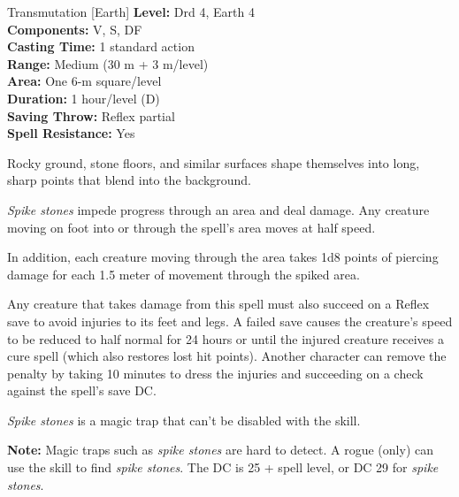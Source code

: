 {Transmutation [Earth]}
{
	\textbf{Level:}
	Drd 4, Earth 4\\
	\textbf{Components:}
	V, S, DF\\
	\textbf{Casting Time:}
	1 standard action\\
	\textbf{Range:}
	Medium (30 m + 3 m/level)\\
	\textbf{Area:}
	One 6-m square/level\\
	\textbf{Duration:}
	1 hour/level (D)\\
	\textbf{Saving Throw:}
	Reflex partial\\
	\textbf{Spell Resistance:}
	Yes\\
}
{
	Rocky ground, stone floors, and similar surfaces shape themselves into long, sharp points that blend into the background.

	\emph{Spike stones} impede progress through an area and deal damage. Any creature moving on foot into or through the spell's area moves at half speed.

	In addition, each creature moving through the area takes 1d8 points of piercing damage for each 1.5 meter of movement through the spiked area.

	Any creature that takes damage from this spell must also succeed on a Reflex save to avoid injuries to its feet and legs. A failed save causes the creature's speed to be reduced to half normal for 24 hours or until the injured creature receives a cure spell (which also restores lost hit points). Another character can remove the penalty by taking 10 minutes to dress the injuries and succeeding on a  check against the spell's save DC.

	\emph{Spike stones} is a magic trap that can't be disabled with the  skill.

	\textbf{Note:} Magic traps such as \emph{spike stones} are hard to detect. A rogue (only) can use the  skill to find \emph{spike stones}. The DC is 25 + spell level, or DC 29 for \emph{spike stones}.

}
